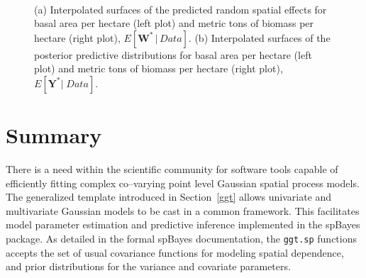 \documentclass[a4paper]{article}
\newcommand{\bW}{\textbf{W}}
\newcommand{\bY}{\textbf{Y}}
\let\code=\texttt
\newcommand{\pkg}[1]{{\normalfont\fontseries{b}\selectfont #1}}
\begin{document}
\begin{figure}[htp]
  \begin{center}
    \\
  \end{center}
  \caption{(a) Interpolated surfaces of the predicted random spatial effects for basal area per hectare (left plot) and metric tons of biomass per hectare (right plot), $E[\bW^{\ast}\,|\, Data]$. (b) Interpolated surfaces of the posterior predictive distributions for basal area per hectare (left plot) and metric tons of biomass per hectare (right plot), $E[\bY^{\ast}|\; Data]$.}
  \label{RealPred}
\end{figure}
\clearpage
\section{Summary}\label{Summary}
There is a need within the scientific community for software tools capable of efficiently fitting complex co--varying point level Gaussian spatial process models.  The generalized template introduced in Section~\ref{ggt} allows univariate and multivariate Gaussian models to be cast in a common framework.  This facilitates model parameter estimation and predictive inference implemented in the \pkg{spBayes} package.  As detailed in the formal \pkg{spBayes} documentation, the \code{ggt.sp} functions accepts the set of usual covariance functions for modeling spatial dependence, and prior distributions for the variance and covariate parameters.
\end{document}
